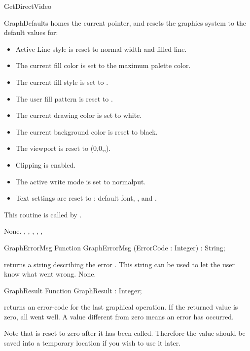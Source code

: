 \begin{function}{GetDirectVideo}
\begin{procedure}{GraphDefaults}
\Description
{} homes the current pointer, and resets the graphics
system to the default values for:

\begin{itemize}
 \item Active Line style is reset to normal width and filled line.
 \item The current fill color is set to the maximum palette color.
 \item The current fill style is set to .
 \item The user fill pattern is reset to .
 \item The current drawing color is set to white.
 \item The current background color is reset to black.
 \item The viewport is reset to (0,0,,).
 \item Clipping is enabled.
 \item The active write mode is set to normalput.
 \item Text settings are reset to : default font, ,
          and .
\end{itemize}

This routine is called by .

\Errors
None.
\SeeAlso
{}, , ,
, , 
\end{procedure}

\begin{function}{GraphErrorMsg}
\Declaration
Function GraphErrorMsg (ErrorCode : Integer) : String;

\Description
{}
returns a string describing the error . This string can be
used to let the user know what went wrong.
\Errors
None.
\SeeAlso
{}
\end{function}
\begin{function}{GraphResult}
\Declaration
Function GraphResult  : Integer;

\Description
{} returns an error-code for
the last graphical operation. If the returned value is zero, all went well.
A value different from zero means an error has occurred.

Note that  is reset to zero after it has been called.
Therefore the value should be saved into a temporary location if you wish
to use it later.


\end{function}
\end{function}
